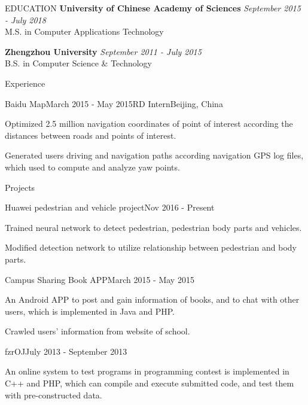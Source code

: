 \documentclass{resume} %
\begin{document}
\begin{rSection}{EDUCATION}
{\bf University of Chinese Academy of Sciences} \hfill {\em September 2015 - July 2018} \\
M.S. in Computer Applications Technology
\vspace{0.3em}

{\bf Zhengzhou University} \hfill {\em September 2011 - July 2015} \\
B.S. in Computer Science \& Technology
\vspace{0.5em}
\end{rSection}




\begin{rSection}{Experience}
\begin{rSubsection}{Baidu Map}{March 2015 - May 2015}{RD Intern}{Beijing, China}
\item Optimized 2.5 million navigation coordinates of point of interest according the distances between roads and points of interest.
\item Generated users driving and navigation paths according navigation GPS log files, which used to compute and analyze yaw points.
\end{rSubsection}
\end{rSection}






\begin{rSection}{Projects}


\begin{rSubsection}{Huawei pedestrian and vehicle project}{Nov 2016 - Present}{}{}
\item Trained neural network to detect pedestrian, pedestrian body parts and vehicles.
\item Modified detection network to utilize relationship between pedestrian and body parts. 
\end{rSubsection}

\begin{rSubsection}{Campus Sharing Book APP}{March 2015 - May 2015}{}{}
\item An Android APP to post and gain information of books, and to chat with other users, which is implemented in Java and PHP.
\item Crawled users' information from website of school.
\end{rSubsection}

\begin{rSubsection}{fzrOJ}{July 2013 - September 2013}{}{}
\item An online system to test programs in programming contest is implemented in C++ and PHP, which can compile and execute submitted code, and test them with pre-constructed data.
\end{rSubsection}

\end{rSection}
\end{document}
